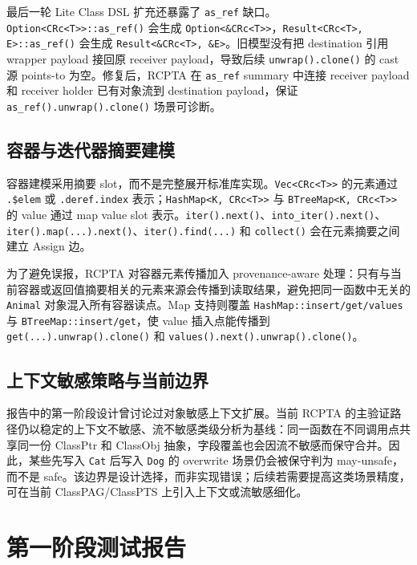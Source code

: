 \documentclass[10.5pt,compsoc,UTF8]{cjc}
\theoremstyle{mystyle}
\begin{document}
最后一轮 Lite Class DSL 扩充还暴露了 \texttt{as\_ref} 缺口。\texttt{Option<CRc<T>>::as\_ref()} 会生成 \texttt{Option<\&CRc<T>>}，\texttt{Result<CRc<T>, E>::as\_ref()} 会生成 \texttt{Result<\&CRc<T>, \&E>}。旧模型没有把 destination 引用 wrapper payload 接回原 receiver payload，导致后续 \texttt{unwrap().clone()} 的 cast 源 points-to 为空。修复后，RCPTA 在 \texttt{as\_ref} summary 中连接 receiver payload 和 receiver holder 已有对象流到 destination payload，保证 \texttt{as\_ref().unwrap().clone()} 场景可诊断。

\subsection{容器与迭代器摘要建模}

容器建模采用摘要 slot，而不是完整展开标准库实现。\texttt{Vec<CRc<T>>} 的元素通过 \texttt{.\$elem} 或 \texttt{.deref.index} 表示；\texttt{HashMap<K, CRc<T>>} 与 \texttt{BTreeMap<K, CRc<T>>} 的 value 通过 map value slot 表示。\texttt{iter().next()}、\texttt{into\_iter().next()}、\texttt{iter().map(...).next()}、\texttt{iter().find(...)} 和 \texttt{collect()} 会在元素摘要之间建立 Assign 边。

为了避免误报，RCPTA 对容器元素传播加入 provenance-aware 处理：只有与当前容器或返回值摘要相关的元素来源会传播到读取结果，避免把同一函数中无关的 \texttt{Animal} 对象混入所有容器读点。Map 支持则覆盖 \texttt{HashMap::insert/get/values} 与 \texttt{BTreeMap::insert/get}，使 value 插入点能传播到 \texttt{get(...).unwrap().clone()} 和 \texttt{values().next().unwrap().clone()}。

\subsection{上下文敏感策略与当前边界}

报告中的第一阶段设计曾讨论过对象敏感上下文扩展。当前 RCPTA 的主验证路径仍以稳定的上下文不敏感、流不敏感类级分析为基线：同一函数在不同调用点共享同一份 ClassPtr 和 ClassObj 抽象，字段覆盖也会因流不敏感而保守合并。因此，某些先写入 \texttt{Cat} 后写入 \texttt{Dog} 的 overwrite 场景仍会被保守判为 may-unsafe，而不是 safe。该边界是设计选择，而非实现错误；后续若需要提高这类场景精度，可在当前 ClassPAG/ClassPTS 上引入上下文或流敏感细化。

\newpage
\doublespacing
\thispagestyle{empty}

{\raggedright
{}
\section{\heiti\centering 第一阶段测试报告}}
\end{document}
